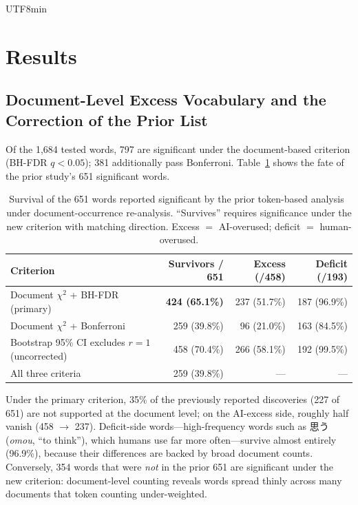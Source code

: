 \documentclass[11pt,a4paper]{article}
\begin{document}
\begin{CJK}{UTF8}{min}
\section{Results}

\subsection{Document-Level Excess Vocabulary and the Correction of the Prior List}
\label{sec:lexresults}

Of the 1{,}684 tested words, 797 are significant under the document-based criterion (BH-FDR $q<0.05$); 381 additionally pass Bonferroni. Table~\ref{tab:survival} shows the fate of the prior study's 651 significant words.

\begin{table}[H]
\centering
\caption{Survival of the 651 words reported significant by the prior token-based analysis~\citep{imoto2026excess} under document-occurrence re-analysis. ``Survives'' requires significance under the new criterion with matching direction. Excess $=$ AI-overused; deficit $=$ human-overused.}
\label{tab:survival}
\small
\begin{tabular}{lrrr}
\toprule
Criterion & Survivors / 651 & Excess (/458) & Deficit (/193) \\
\midrule
Document $\chi^2$ + BH-FDR (primary) & \textbf{424 (65.1\%)} & 237 (51.7\%) & 187 (96.9\%) \\
Document $\chi^2$ + Bonferroni       & 259 (39.8\%) & 96 (21.0\%) & 163 (84.5\%) \\
Bootstrap 95\% CI excludes $r=1$ (uncorrected) & 458 (70.4\%) & 266 (58.1\%) & 192 (99.5\%) \\
All three criteria                   & 259 (39.8\%) & --- & --- \\
\bottomrule
\end{tabular}
\end{table}

Under the primary criterion, 35\% of the previously reported discoveries (227 of 651) are not supported at the document level; on the AI-excess side, roughly half vanish (458 $\to$ 237). Deficit-side words---high-frequency words such as 思う (\textit{omou}, ``to think''), which humans use far more often---survive almost entirely (96.9\%), because their differences are backed by broad document counts. Conversely, 354 words that were \emph{not} in the prior 651 are significant under the new criterion: document-level counting reveals words spread thinly across many documents that token counting under-weighted.


\end{CJK}
\end{document}
